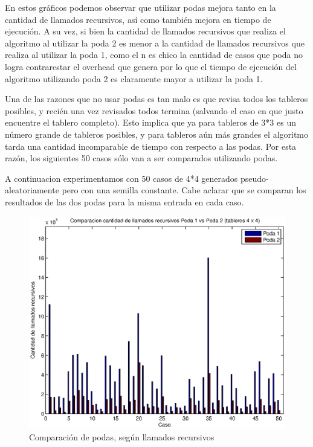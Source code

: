 En estos gráficos podemos observar que utilizar podas mejora tanto en la cantidad de llamados recursivos, así como también mejora en tiempo de ejecución. A su vez, si bien la cantidad de llamados recursivos que realiza el algoritmo al utilizar la poda 2 es menor a la cantidad de llamados recursivos que realiza al utilizar la poda 1, como el n es chico la cantidad de casos que poda no logra contrarestar el overhead que genera por lo que el tiempo de ejecución del algoritmo utilizando poda 2 es claramente mayor a utilizar la poda 1.

Una de las razones que no usar podas es tan malo es que revisa todos los tableros posibles, y recién una vez revisados todos termina (salvando el caso en que justo encuentre el tablero completo). Esto implica que ya para tableros de 3*3 es un número grande de tableros posibles, y para tableros aún más grandes el algoritmo tarda una cantidad incomparable de tiempo con respecto a las podas. Por esta razón, los siguientes 50 casos sólo van a ser comparados utilizando podas.

A continuacion experimentamos con 50 casos de 4*4 generados pseudo-aleatoriamente pero con una semilla constante. Cabe aclarar que se comparan los resultados de las dos podas para la misma entrada en cada caso.

\begin{center}
  \begin{figure}[H]
    \includegraphics[width=\linewidth]{problema3/graficos/comparacion_podas1y2_llamados_recursivos.eps}
    \caption{Comparación de podas, según llamados recursivos}
    \label{fig:problema3-podas-llamados}
  \end{figure}
\end{center}


